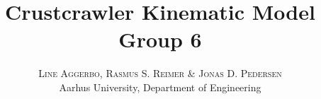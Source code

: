 

\title{
	\vspace{-15mm}
	\fontsize{24pt}{10pt}
	\selectfont
	\textbf{Crustcrawler Kinematic Model \\ \vspace{5mm} \Large Group 6}
}

\author{
	\large
	\textsc{Line Aggerbo, Rasmus S. Reimer \& Jonas D. Pedersen}\\[2mm]
	\normalsize Aarhus University, Department of Engineering \\
	\vspace{-5mm}
}
\date{}




\maketitle
\thispagestyle{fancy} %
\raggedright





\begingroup
	\raggedright
	
\endgroup


